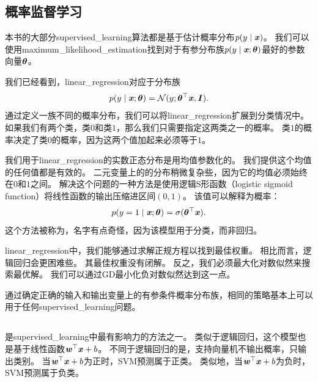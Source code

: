 
\subsection{概率监督学习}
\label{sec:probabilistic_supervised_learning}
本书的大部分\gls{supervised_learning}算法都是基于估计概率分布$p(y\mid\boldsymbol{\mathit{x}})$。
我们可以使用\gls{maximum_likelihood_estimation}找到对于有参分布族$p(y\mid\boldsymbol{\mathit{x}};\boldsymbol{\theta})$最好的参数向量$\boldsymbol{\theta}$。 

我们已经看到，\gls{linear_regression}对应于分布族
\begin{equation}
    p(y \mid \boldsymbol{\mathit{x}}; \boldsymbol{\theta}) = \mathcal{N}( y; \boldsymbol{\theta}^\top \boldsymbol{\mathit{x}}, \boldsymbol{\mathit{I}}).
\end{equation}
通过定义一族不同的概率分布，我们可以将\gls{linear_regression}扩展到分类情况中。
如果我们有两个类，类$0$和类$1$，那么我们只需要指定这两类之一的概率。
类$1$的概率决定了类$0$的概率，因为这两个值加起来必须等于$1$。

我们用于\gls{linear_regression}的实数正态分布是用均值参数化的。
我们提供这个均值的任何值都是有效的。
二元变量上的的分布稍微复杂些，因为它的均值必须始终在$0$和$1$之间。
解决这个问题的一种方法是使用逻辑S形函数（logistic sigmoid function）将线性函数的输出压缩进区间$(0,1)$。
该值可以解释为概率：
\begin{equation}
    p(y = 1 \mid \boldsymbol{\mathit{x}}; \boldsymbol{\theta}) = \sigma(\boldsymbol{\theta}^\top \boldsymbol{\mathit{x}}).
\end{equation}
这个方法被称为，名字有点奇怪，因为该模型用于分类，而非回归。

\gls{linear_regression}中，我们能够通过求解正规方程以找到最佳权重。
相比而言，逻辑回归会更困难些。
其最佳权重没有闭解。
反之，我们必须最大化对数似然来搜索最优解。
我们可以通过\gls{GD}最小化负对数似然达到这一点。

通过确定正确的输入和输出变量上的有参条件概率分布族，相同的策略基本上可以用于任何\gls{supervised_learning}问题。

\subsection{}
\label{sec:support_vector_machines}
是\gls{supervised_learning}中最有影响力的方法之一\citep{Boser92,Cortes95}。
类似于逻辑回归，这个模型也是基于线性函数$\boldsymbol{\mathit{w}}^\top \boldsymbol{\mathit{x}} + b$。
不同于逻辑回归的是，支持向量机不输出概率，只输出类别。
当$\boldsymbol{\mathit{w}}^\top\boldsymbol{\mathit{x}} + b$为正时，\gls{SVM}预测属于正类。
类似地，当$\boldsymbol{\mathit{w}}^\top\boldsymbol{\mathit{x}} + b$为负时，\gls{SVM}预测属于负类。


